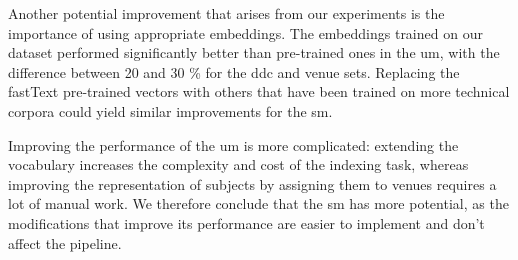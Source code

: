 Another potential improvement that arises from our experiments is the importance of using appropriate embeddings. The embeddings trained on our dataset performed significantly better than pre-trained ones in the \acrshort{um}, with the difference between 20 and 30 \% for the \acrshort{ddc} and venue sets. Replacing the fastText pre-trained vectors with others that have been trained on more technical corpora could yield similar improvements for the \acrshort{sm}.

Improving the performance of the \acrshort{um} is more complicated: extending the vocabulary increases the complexity and cost of the indexing task, whereas improving the representation of subjects by assigning them to venues requires a lot of manual work. We therefore conclude that the \acrshort{sm} has more potential, as the modifications that improve its performance are easier to implement and don't affect the pipeline.